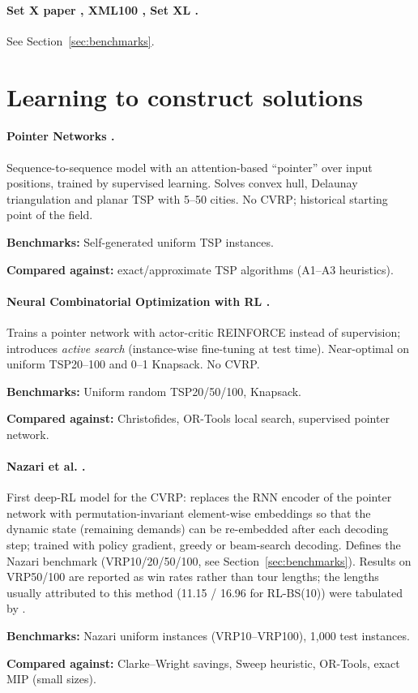 \documentclass[11pt]{article}
\newcommand{\benchline}[1]{\par\smallskip\noindent\textbf{Benchmarks:} #1}
\newcommand{\baseline}[1]{\par\noindent\textbf{Compared against:} #1}
\begin{document}
\paragraph{Set X paper \citep{uchoa_new_2017}, XML100 \citep{queiroga_10000_nodate},
Set XL \citep{queiroga_xl_2026}.} See Section~\ref{sec:benchmarks}.

\section{Learning to construct solutions}

\paragraph{Pointer Networks \citep{vinyals_pointer_2015}.}
Sequence-to-sequence model with an attention-based ``pointer'' over input positions,
trained by supervised learning. Solves convex hull, Delaunay triangulation and planar TSP
with 5--50 cities. No CVRP; historical starting point of the field.
\benchline{Self-generated uniform TSP instances.}
\baseline{exact/approximate TSP algorithms (A1--A3 heuristics).}

\paragraph{Neural Combinatorial Optimization with RL \citep{bello_neural_2016}.}
Trains a pointer network with actor-critic REINFORCE instead of supervision; introduces
\emph{active search} (instance-wise fine-tuning at test time). Near-optimal on uniform
TSP20--100 and 0--1 Knapsack. No CVRP.
\benchline{Uniform random TSP20/50/100, Knapsack.}
\baseline{Christofides, OR-Tools local search, supervised pointer network.}

\paragraph{Nazari et al. \citep{nazari_reinforcement_2018}.}
First deep-RL model for the CVRP: replaces the RNN encoder of the pointer network with
permutation-invariant element-wise embeddings so that the dynamic state (remaining
demands) can be re-embedded after each decoding step; trained with policy gradient, greedy
or beam-search decoding. Defines the Nazari benchmark (VRP10/20/50/100, see
Section~\ref{sec:benchmarks}). Results on VRP50/100 are reported as win rates rather than
tour lengths; the lengths usually attributed to this method (11.15 / 16.96 for RL-BS(10))
were tabulated by \citet{kool_attention_2018}.
\benchline{Nazari uniform instances (VRP10--VRP100), 1{,}000 test instances.}
\baseline{Clarke--Wright savings, Sweep heuristic, OR-Tools, exact MIP (small sizes).}
\end{document}
